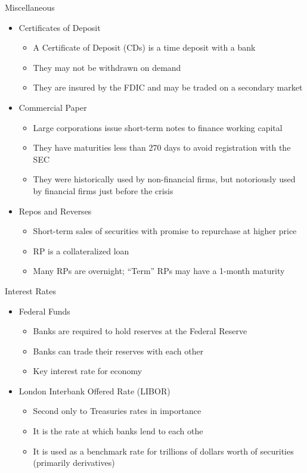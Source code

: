 \documentclass{beamer}
\begin{document}
\begin{frame}{Miscellaneous}
	\begin{itemize}
		\item Certificates of Deposit
			\begin{itemize}
				\item A Certificate of Deposit (CDs) is a time deposit with a bank 
				\item They may not be withdrawn on demand
				\item They are insured by the FDIC and may be traded on a secondary market
			\end{itemize}
		\item Commercial Paper
			\begin{itemize}
				\item Large corporations issue short-term notes to finance working capital
				\item They have maturities less than 270 days to avoid registration with the SEC
				\item They were historically used by non-financial firms, but notoriously used by financial firms just before the crisis  
			\end{itemize}
		\item Repos and Reverses
			\begin{itemize}
				\item Short-term sales of securities with promise to repurchase at higher price
				\item RP is a collateralized loan
				\item Many RPs are overnight; ``Term'' RPs may have a 1-month maturity
			\end{itemize}
	\end{itemize}
\end{frame}


\begin{frame}{Interest Rates}
	\begin{itemize}
		\item Federal Funds
		\begin{itemize}
			\item Banks are required to hold reserves at the Federal Reserve 
			\item Banks can trade their reserves with each other  
			\item Key interest rate for economy
		\end{itemize}
		\item London Interbank Offered Rate (LIBOR)
		\begin{itemize}
			\item Second only to Treasuries rates in importance
			\item It is the rate at which banks lend to each othe
			\item It is used as a benchmark rate for trillions of dollars worth of securities (primarily derivatives)
		\end{itemize}
	\end{itemize}
\end{frame}
\end{document}
